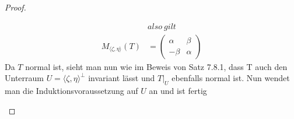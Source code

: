 \documentclass[12pt,a4paper]{article}
\theoremstyle{definition}
\theoremstyle{remark}
\begin{document}
\begin{proof}
\begin{itemize}
\begin{equation}
\begin{split}
					&also \ gilt \\
					M_{\langle\zeta,\eta \rangle}(T) &= 
					\begin{pmatrix}
						\alpha & \beta \\
						-\beta & \alpha
					\end{pmatrix}
				\end{split}
			\end{equation}
			Da $T$ normal ist, sieht man nun wie im Beweis von Satz 7.8.1, dass T auch den Unterraum $U = \langle \zeta,\eta \rangle^{\perp}$ invariant lässt und $T|_U$ ebenfalls normal ist. Nun wendet man die Induktionsvoraussetzung auf $U$ an und ist fertig
		\end{itemize}
	\end{proof}
	
	\newpage	
	
\end{document}
